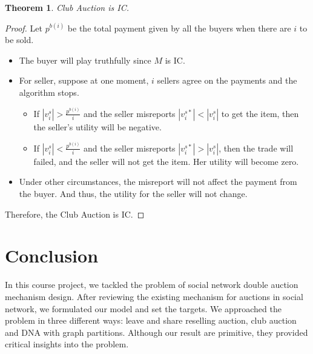 \documentclass[format=acmsmall, review=false, natbib=false]{acmart}
\newtheorem{theorem}{Theorem}[section]
\begin{document}
\begin{theorem}
	Club Auction is IC.
\end{theorem}
\begin{proof}
	Let \(p^{b(i)}\) be the total payment given by all the buyers when there are \(i\) to be sold.
	\begin{itemize}
		\item The buyer will play truthfully since \(M\) is IC.
		\item For seller, suppose at one moment, \(i\) sellers agree on the payments and the algorithm stops.
		      \begin{itemize}
			      \item If \(|v^s_i| > \frac{p^{b(i)}}{i}\) and the seller misreports \(|v^{s*}_i| < |v^s_i| \) to get the item, then the seller's utility will be negative.
			      \item If \(|v^s_i| < \frac{p^{b(i)}}{i}\) and the seller misreports \(|v^{s*}_i| > |v^s_i| \), then the trade will failed, and the seller will not get the item. Her utility will become zero.
		      \end{itemize}
		\item Under other circumstances, the misreport will not affect the payment from the buyer. And thus, the utility for the seller will not change.
	\end{itemize}
	Therefore, the Club Auction is IC.

\end{proof}


\section{Conclusion}

In this course project, we tackled the problem of social network double auction mechanism design.
After reviewing the existing mechanism for auctions in social network, we formulated our model and set the targets.
We approached the problem in three different ways: leave and share reselling auction, club auction and DNA with graph partitions. Although our result are primitive, they provided critical insights into the problem.

\printbibliography
\end{document}
